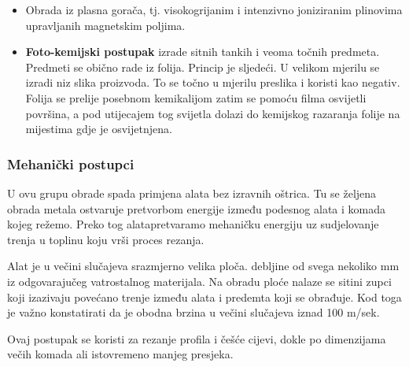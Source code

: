 \documentclass[a4paper,12pt]{article}
\numberwithin{figure}{section}
\begin{document}
\begin{enumerate}
\begin{itemize}
\item Obrada iz plasna gorača, tj. visokogrijanim i intenzivno joniziranim plinovima upravljanih magnetskim poljima.
\item \textbf{Foto-kemijski postupak} izrade sitnih tankih i veoma točnih predmeta. Predmeti se obično rade iz folija. Princip je sljedeći. U velikom mjerilu se izradi niz slika proizvoda. To se točno u mjerilu preslika i koristi kao negativ. Folija se prelije posebnom kemikalijom zatim se pomoću filma osvijetli površina, a pod utijecajem tog svijetla dolazi do kemijskog razaranja folije na mijestima gdje je osvijetnjena.
\end{itemize}
\end{enumerate}
\subsubsection{Mehanički postupci}
U ovu grupu obrade spada primjena alata bez izravnih oštrica. Tu se željena obrada metala ostvaruje pretvorbom energije između podesnog alata i komada kojeg režemo. Preko tog alatapretvaramo mehaničku energiju uz sudjelovanje trenja u toplinu koju vrši proces rezanja.\par
Alat je u večini slučajeva srazmjerno velika ploča. debljine od svega nekoliko mm iz odgovarajučeg vatrostalnog materijala. Na obradu ploće nalaze se sitini zupci koji izazivaju povećano trenje između alata i predemta koji se obrađuje. Kod toga je važno konstatirati da je obodna brzina u večini slučajeva iznad 100 m/sek. \par
Ovaj postupak se koristi za rezanje profila i češće cijevi, dokle po dimenzijama večih komada ali istovremeno manjeg presjeka.
\end{document}
